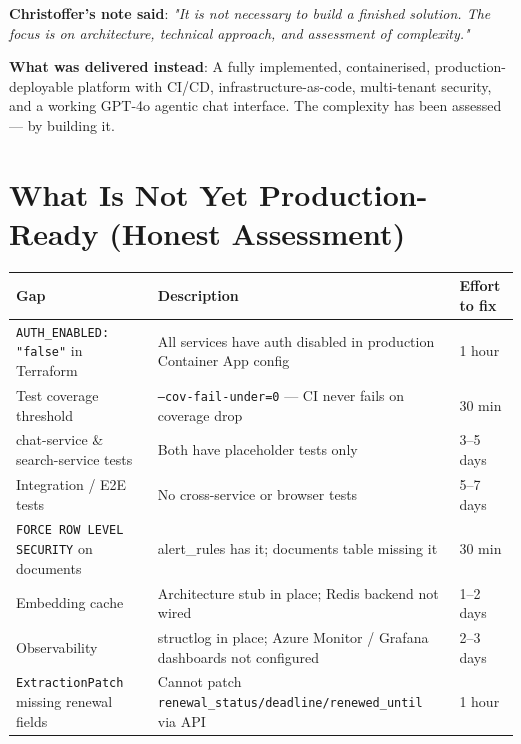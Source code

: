 \documentclass[12pt,a4paper]{article}
\newcommand{\codeinline}[1]{\texttt{\small\color{NordicBlue}#1}}
\begin{document}
\vspace{0.8em}
\begin{tcolorbox}[colback=NordicGreen!8, colframe=NordicGreen, boxrule=1pt, arc=4pt]
\textbf{Christoffer's note said}: \textit{"It is not necessary to build a finished solution. The focus is on architecture, technical approach, and assessment of complexity."}

\vspace{0.4em}
\textbf{What was delivered instead}: A fully implemented, containerised, production-deployable platform with CI/CD, infrastructure-as-code, multi-tenant security, and a working GPT-4o agentic chat interface. The complexity has been assessed — by building it.
\end{tcolorbox}

\newpage

\section{What Is Not Yet Production-Ready (Honest Assessment)}

\begin{tabularx}{\textwidth}{lXl}
\toprule
\textbf{Gap} & \textbf{Description} & \textbf{Effort to fix} \\
\midrule
\codeinline{AUTH\_ENABLED: "false"} in Terraform & All services have auth disabled in production Container App config & 1 hour \\
Test coverage threshold & \codeinline{--cov-fail-under=0} — CI never fails on coverage drop & 30 min \\
chat-service \& search-service tests & Both have placeholder tests only & 3–5 days \\
Integration / E2E tests & No cross-service or browser tests & 5–7 days \\
\codeinline{FORCE ROW LEVEL SECURITY} on documents & alert\_rules has it; documents table missing it & 30 min \\
Embedding cache & Architecture stub in place; Redis backend not wired & 1–2 days \\
Observability & structlog in place; Azure Monitor / Grafana dashboards not configured & 2–3 days \\
\codeinline{ExtractionPatch} missing renewal fields & Cannot patch \codeinline{renewal\_status/deadline/renewed\_until} via API & 1 hour \\
\bottomrule
\end{tabularx}
\end{document}
